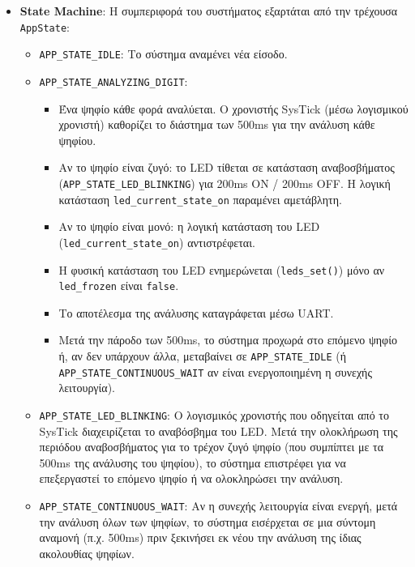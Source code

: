 \documentclass{article}
\begin{document}
\begin{enumerate}
\begin{itemize}
        \item \textbf{State Machine}: Η συμπεριφορά του συστήματος εξαρτάται από την τρέχουσα \texttt{AppState}:
        \begin{itemize}
            \item \texttt{APP\_STATE\_IDLE}: Το σύστημα αναμένει νέα είσοδο.
            \item \texttt{APP\_STATE\_ANALYZING\_DIGIT}:
                \begin{itemize}
                    \item Ένα ψηφίο κάθε φορά αναλύεται. Ο χρονιστής SysTick (μέσω λογισμικού χρονιστή) καθορίζει το διάστημα των 500ms για την ανάλυση κάθε ψηφίου.
                    \item Αν το ψηφίο είναι ζυγό: το LED τίθεται σε κατάσταση αναβοσβήματος (\texttt{APP\_STATE\_LED\_BLINKING}) για 200ms ON / 200ms OFF. Η λογική κατάσταση \texttt{led\_current\_state\_on} παραμένει αμετάβλητη.
                    \item Αν το ψηφίο είναι μονό: η λογική κατάσταση του LED (\texttt{led\_current\_state\_on}) αντιστρέφεται.
                    \item Η φυσική κατάσταση του LED ενημερώνεται (\texttt{leds\_set()}) μόνο αν \texttt{led\_frozen} είναι \texttt{false}.
                    \item Το αποτέλεσμα της ανάλυσης καταγράφεται μέσω UART.
                    \item Μετά την πάροδο των 500ms, το σύστημα προχωρά στο επόμενο ψηφίο ή, αν δεν υπάρχουν άλλα, μεταβαίνει σε \texttt{APP\_STATE\_IDLE} (ή \texttt{APP\_STATE\_CONTINUOUS\_WAIT} αν είναι ενεργοποιημένη η συνεχής λειτουργία).
                \end{itemize}
            \item \texttt{APP\_STATE\_LED\_BLINKING}: Ο λογισμικός χρονιστής που οδηγείται από το SysTick διαχειρίζεται το αναβόσβημα του LED. Μετά την ολοκλήρωση της περιόδου αναβοσβήματος για το τρέχον ζυγό ψηφίο (που συμπίπτει με τα 500ms της ανάλυσης του ψηφίου), το σύστημα επιστρέφει για να επεξεργαστεί το επόμενο ψηφίο ή να ολοκληρώσει την ανάλυση.
            \item \texttt{APP\_STATE\_CONTINUOUS\_WAIT}: Αν η συνεχής λειτουργία είναι ενεργή, μετά την ανάλυση όλων των ψηφίων, το σύστημα εισέρχεται σε μια σύντομη αναμονή (π.χ. 500ms) πριν ξεκινήσει εκ νέου την ανάλυση της ίδιας ακολουθίας ψηφίων.
        \end{itemize}
    \end{itemize}


\end{enumerate}
\end{document}
